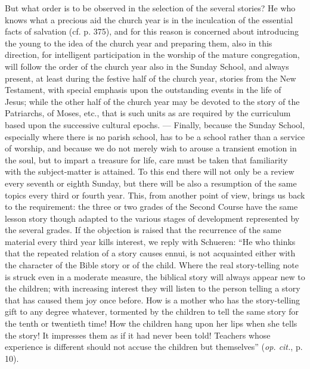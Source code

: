 But what order is to be observed in the selection of the several stories? He who knows what a precious aid the church year is in the inculcation of the essential facts of salvation (cf. p. 375), and for this reason is concerned about introducing the young to the idea of the church year and preparing them, also in this direction, for intelligent participation
in the worship of the mature congregation, will follow the order of the church year also in the Sunday School, and always present, at least during the festive half of the church year, stories from the New Testament, with special emphasis upon the outstanding events in the life of Jesus; while the other half of the church year may be devoted to the story of the Patriarchs, of Moses, etc., that is such units as are required by the curriculum based upon the successive cultural epochs. — Finally, because the Sunday School, especially where there is no parish school, has to be a school rather than a service of worship, and because we do not merely wish to arouse a transient emotion in the soul, but to impart a treasure for life, care must be taken that familiarity with the subject-matter is attained. To this end there will not only be a review every seventh or eighth Sunday, but there will be also a resumption of the same topics every third or fourth year. This, from another point of view, brings us back to the requirement: the three or two grades of the Second Course have the same lesson story though adapted to the various stages of development represented by the several grades. If the objection is raised that the recurrence of the same material every third year kills interest, we reply with Schueren: “He who thinks that the repeated relation of a story causes ennui, is not acquainted either with the character of the Bible story or of the child. Where the real story-telling note is struck even in a moderate measure, the biblical story will always appear new to the children; with increasing interest they will listen to the person telling a story that has caused them joy once before. How is a mother who has the story-telling gift to any degree whatever, tormented by the children to tell the same story for the tenth or twentieth time! How the children hang upon her lips when she tells the story! It impresses them as if it had never been told! Teachers whose experience is different should not accuse the children but themselves” (\emph{op. cit.}, p. 10).

